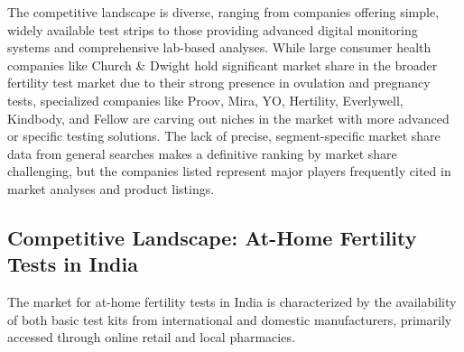 \documentclass{article}
\begin{document}
The competitive landscape is diverse, ranging from companies offering simple, widely available test strips to those providing advanced digital monitoring systems and comprehensive lab-based analyses. While large consumer health companies like Church \& Dwight hold significant market share in the broader fertility test market due to their strong presence in ovulation and pregnancy tests, specialized companies like Proov, Mira, YO, Hertility, Everlywell, Kindbody, and Fellow are carving out niches in the market with more advanced or specific testing solutions. The lack of precise, segment-specific market share data from general searches makes a definitive ranking by market share challenging, but the companies listed represent major players frequently cited in market analyses and product listings.

\subsection{Competitive Landscape: At-Home Fertility Tests in India}

The market for at-home fertility tests in India is characterized by the availability of both basic test kits from international and domestic manufacturers, primarily accessed through online retail and local pharmacies.
\end{document}
